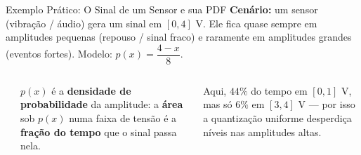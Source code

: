 \begin{frame}{Exemplo Prático: O Sinal de um Sensor e sua PDF}
  \textbf{Cenário:} um sensor (vibração / áudio) gera um sinal em $[0,4]$ V.
  Ele fica quase sempre em amplitudes pequenas (repouso / sinal fraco) e
  raramente em amplitudes grandes (eventos fortes). Modelo:
  $p(x) = \dfrac{4-x}{8}$.

  \vspace{0.05cm}
  \begin{columns}[c]
    \begin{center}
    \end{center}

    {\footnotesize
    $p(x)$ é a \textbf{densidade de probabilidade} da amplitude: a
    \textbf{área} sob $p(x)$ numa faixa de tensão é a \textbf{fração do
    tempo} que o sinal passa nela.

    \vspace{0.2cm}
    Aqui, $44\%$ do tempo em $[0,1]$ V, mas só $6\%$ em $[3,4]$ V — por
    isso a quantização uniforme desperdiça níveis nas amplitudes altas.}
  \end{columns}
\end{frame}



